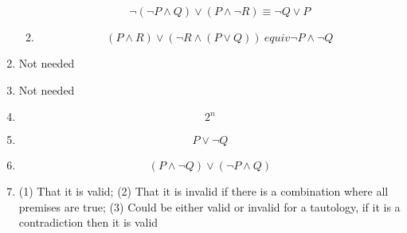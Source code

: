 \begin{enumerate}
\begin{enumerate}
        \[\lnot (\lnot P \land Q) \lor (P \land \lnot R) \equiv \lnot Q \lor P\]
        \item 
        \[(P \land R) \lor (\lnot R \land (P \lor Q)) \ equiv \lnot P \land \lnot Q\]
    \end{enumerate}
    \item 
    Not needed
    \item 
    Not needed
    \item 
    \[2 ^ n\]
    \item 
    \[P \lor \lnot Q\]
    \item
    \[(P \land \lnot Q) \lor (\lnot P \land Q)\]
    \item
    (1) That it is valid; (2) That it is invalid if there is a combination where all premises are true; (3) Could be either valid or invalid for a tautology, if it is a contradiction then it is valid
\end{enumerate}
